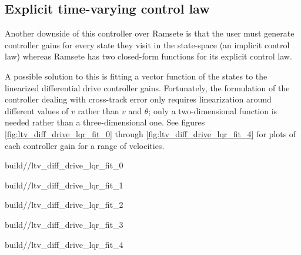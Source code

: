 \subsection{Explicit time-varying control law}

Another downside of this controller over Ramsete is that the user must generate
controller gains for every state they visit in the state-space (an implicit
control law) whereas Ramsete has two closed-form functions for its explicit
control law.

A possible solution to this is fitting a vector function of the states to the
linearized differential drive controller gains. Fortunately, the formulation of
the controller dealing with cross-track error only requires linearization around
different values of $v$ rather than $v$ and $\theta$; only a two-dimensional
function is needed rather than a three-dimensional one. See figures
\ref{fig:ltv_diff_drive_lqr_fit_0} through
\ref{fig:ltv_diff_drive_lqr_fit_4} for plots of each controller gain for
a range of velocities.
\begin{bookfigure}
  \begin{minisvg}{2}{build/\chapterpath/ltv_diff_drive_lqr_fit_0}
    \caption{Linear time-varying differential drive controller LQR gain
      regression fit ($x$)}
    \label{fig:ltv_diff_drive_lqr_fit_0}
  \end{minisvg}
  \hfill
  \begin{minisvg}{2}{build/\chapterpath/ltv_diff_drive_lqr_fit_1}
    \caption{Linear time-varying differential drive controller LQR gain fit
      regression fit ($y$)}
  \end{minisvg}
  \hfill
  \begin{minisvg}{2}{build/\chapterpath/ltv_diff_drive_lqr_fit_2}
    \caption{Linear time-varying differential drive controller LQR gain
      regression fit ($\theta$)}
  \end{minisvg}
  \hfill
  \begin{minisvg}{2}{build/\chapterpath/ltv_diff_drive_lqr_fit_3}
    \caption{Linear time-varying differential drive controller LQR gain
      regression fit ($v_l$)}
  \end{minisvg}
  \hfill
  \begin{minisvg}{2}{build/\chapterpath/ltv_diff_drive_lqr_fit_4}
    \caption{Linear time-varying differential drive controller LQR gain
      regression fit ($v_r$)}
    \label{fig:ltv_diff_drive_lqr_fit_4}
  \end{minisvg}
\end{bookfigure}

